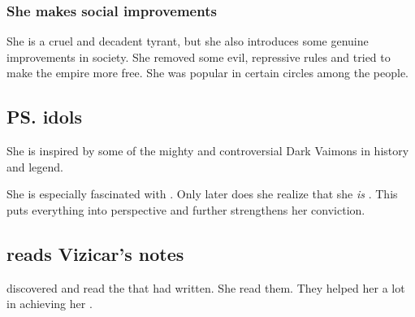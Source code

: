 \subsubsection{She makes social improvements}
She is a cruel and decadent tyrant, but she also introduces some genuine improvements in society. 
She removed some evil, repressive rules and tried to make the empire more free. 
She was popular in certain circles among the people. 









\subsection{\ps{\Belzir}{} idols}
She is inspired by some of the mighty and controversial Dark Vaimons in history and legend. 

She is especially fascinated with \Delphine. 
Only later does she realize that she \emph{is} \Delphine. 
This puts everything into perspective and further strengthens her conviction. 










\subsection{\Belzir{} reads Vizicar's notes}
\Belzir{} discovered and read the  that \VizicarDurasRespina{} had written. 
She read them. 
They helped her a lot in achieving her \apotheosis. 









